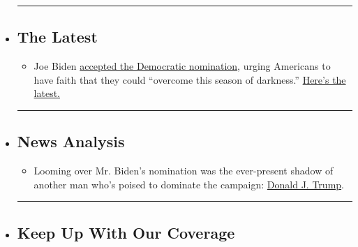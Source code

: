 \begin{itemize}
\item
  \begin{center}\rule{0.5\linewidth}{\linethickness}\end{center}

  \hypertarget{the-latest}{%
  \subsection{The Latest}\label{the-latest}}

  \begin{itemize}
  \tightlist
  \item
    Joe Biden
    \href{https://www.nytimes3xbfgragh.onion/live/2020/08/21/us/dnc-convention-election?action=click\&pgtype=Article\&state=default\&region=BELOW_MAIN_CONTENT\&context=storylines_guide}{accepted
    the Democratic nomination}, urging Americans to have faith that they
    could ``overcome this season of darkness.''
    \href{https://www.nytimes3xbfgragh.onion/live/2020/08/21/us/dnc-convention-election?action=click\&pgtype=Article\&state=default\&region=BELOW_MAIN_CONTENT\&context=storylines_guide}{Here's
    the latest.}
  \end{itemize}
\item
  \begin{center}\rule{0.5\linewidth}{\linethickness}\end{center}

  \hypertarget{news-analysis}{%
  \subsection{News Analysis}\label{news-analysis}}

  \begin{itemize}
  \tightlist
  \item
    Looming over Mr. Biden's nomination was the ever-present shadow of
    another man who's poised to dominate the campaign:
    \href{https://www.nytimes3xbfgragh.onion/2020/08/20/us/politics/biden-dnc-speech-trump.html?action=click\&pgtype=Article\&state=default\&region=BELOW_MAIN_CONTENT\&context=storylines_guide}{Donald
    J. Trump}.
  \end{itemize}
\item
  \begin{center}\rule{0.5\linewidth}{\linethickness}\end{center}

  \hypertarget{keep-up-with-our-coverage}{%
  \subsection{Keep Up With Our
  Coverage}\label{keep-up-with-our-coverage}}


\end{itemize}
